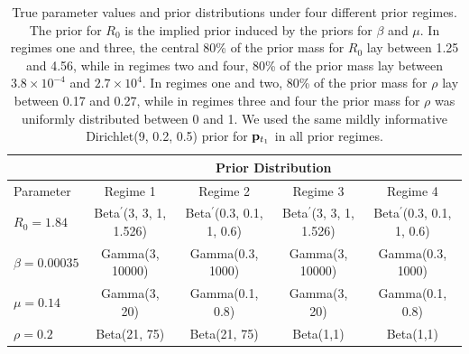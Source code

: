 \begin{table}[htbp]
	\centering	
	\footnotesize
	\begin{tabular}{lcccc}
		\hline & \multicolumn{4}{c}{Prior Distribution} \\
		\hline
		Parameter & Regime 1 & Regime 2 & Regime 3 & Regime 4\\
		\hline
		$R_0 = 1.84$ & Beta$ ^\prime $(3, 3, 1, 1.526) & Beta$ ^\prime $(0.3, 0.1, 1, 0.6) & Beta$ ^\prime $(3, 3, 1, 1.526) & Beta$ ^\prime $(0.3, 0.1, 1, 0.6) \\
		$\beta = 0.00035$ & Gamma(3, 10000) & Gamma(0.3, 1000) & Gamma(3, 10000)& Gamma(0.3, 1000) \\
		$\mu = 0.14$ & Gamma(3, 20) & Gamma(0.1, 0.8) & Gamma(3, 20)& Gamma(0.1, 0.8)  \\
		$\rho = 0.2$ & Beta(21, 75) & Beta(21, 75) & Beta(1,1) & Beta(1,1)\\
		\hline 
	\end{tabular} 
	\caption{True parameter values and prior distributions under four different prior regimes. The prior for $ R_0 $ is the implied prior induced by the priors for $ \beta $ and $ \mu $. In regimes one and three, the central 80\% of the prior mass for $ R_0 $ lay between 1.25 and 4.56, while in regimes two and four, 80\% of the prior mass lay between $ 3.8\times10^{-4} $ and $ 2.7\times 10^4 $. In regimes one and two, 80\% of the prior mass for $ \rho $ lay between 0.17 and 0.27, while in regimes three and four the prior mass for $ \rho $ was uniformly distributed between 0 and 1. We used the same mildly informative Dirichlet(9, 0.2, 0.5) prior for $ \mathbf{p}_{t_1} $ in all prior regimes.}
	\label{tab:prior_effect_priors}
\end{table}

